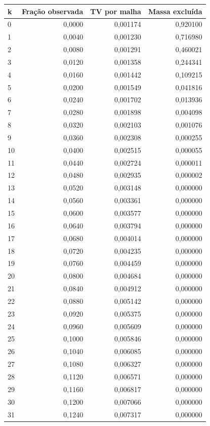 \begin{tabular}{lrrr}
\toprule
k & Fração observada & TV por malha & Massa excluída \\
\midrule
0 & 0,0000 & 0,001174 & 0,920100 \\
1 & 0,0040 & 0,001230 & 0,716980 \\
2 & 0,0080 & 0,001291 & 0,460021 \\
3 & 0,0120 & 0,001358 & 0,244341 \\
4 & 0,0160 & 0,001442 & 0,109215 \\
5 & 0,0200 & 0,001549 & 0,041816 \\
6 & 0,0240 & 0,001702 & 0,013936 \\
7 & 0,0280 & 0,001898 & 0,004098 \\
8 & 0,0320 & 0,002103 & 0,001076 \\
9 & 0,0360 & 0,002308 & 0,000255 \\
10 & 0,0400 & 0,002515 & 0,000055 \\
11 & 0,0440 & 0,002724 & 0,000011 \\
12 & 0,0480 & 0,002935 & 0,000002 \\
13 & 0,0520 & 0,003148 & 0,000000 \\
14 & 0,0560 & 0,003361 & 0,000000 \\
15 & 0,0600 & 0,003577 & 0,000000 \\
16 & 0,0640 & 0,003794 & 0,000000 \\
17 & 0,0680 & 0,004014 & 0,000000 \\
18 & 0,0720 & 0,004235 & 0,000000 \\
19 & 0,0760 & 0,004459 & 0,000000 \\
20 & 0,0800 & 0,004684 & 0,000000 \\
21 & 0,0840 & 0,004912 & 0,000000 \\
22 & 0,0880 & 0,005142 & 0,000000 \\
23 & 0,0920 & 0,005375 & 0,000000 \\
24 & 0,0960 & 0,005609 & 0,000000 \\
25 & 0,1000 & 0,005846 & 0,000000 \\
26 & 0,1040 & 0,006085 & 0,000000 \\
27 & 0,1080 & 0,006327 & 0,000000 \\
28 & 0,1120 & 0,006571 & 0,000000 \\
29 & 0,1160 & 0,006817 & 0,000000 \\
30 & 0,1200 & 0,007066 & 0,000000 \\
31 & 0,1240 & 0,007317 & 0,000000 \\

\end{tabular}
